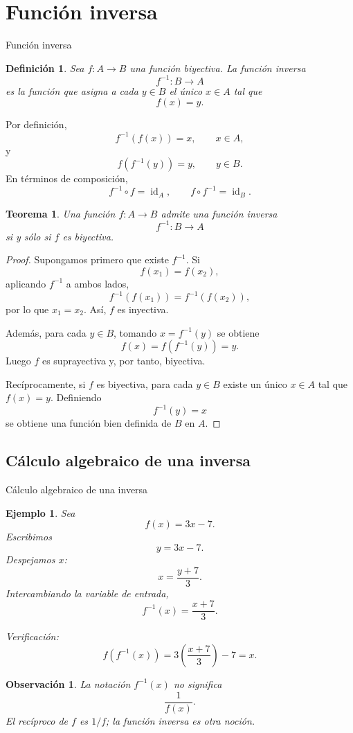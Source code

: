 \documentclass[aspectratio=169,10pt]{beamer}
\newtheorem{definicion}{Definición}
\newtheorem{teorema}{Teorema}
\newtheorem{observacion}{Observación}
\newtheorem{ejemplo}{Ejemplo}
\newcommand{\id}{\operatorname{id}}
\begin{document}
\section{Función inversa}
\begin{frame}{Función inversa}
\begin{definicion}
Sea $f:A\to B$ una función biyectiva. La función inversa
\[
f^{-1}:B\to A
\]
es la función que asigna a cada $y\in B$ el único $x\in A$ tal que
\[
f(x)=y.
\]
\end{definicion}

Por definición,
\[
f^{-1}(f(x))=x,\qquad x\in A,
\]
y
\[
f(f^{-1}(y))=y,\qquad y\in B.
\]
En términos de composición,
\[
f^{-1}\circ f=\id_A,
\qquad
f\circ f^{-1}=\id_B.
\]

\begin{teorema}
Una función $f:A\to B$ admite una función inversa
\[
f^{-1}:B\to A
\]
si y sólo si $f$ es biyectiva.
\end{teorema}

\begin{proof}
Supongamos primero que existe $f^{-1}$. Si
\[
f(x_1)=f(x_2),
\]
aplicando $f^{-1}$ a ambos lados,
\[
f^{-1}(f(x_1))=f^{-1}(f(x_2)),
\]
por lo que $x_1=x_2$. Así, $f$ es inyectiva.

Además, para cada $y\in B$, tomando $x=f^{-1}(y)$ se obtiene
\[
f(x)=f(f^{-1}(y))=y.
\]
Luego $f$ es suprayectiva y, por tanto, biyectiva.

Recíprocamente, si $f$ es biyectiva, para cada $y\in B$ existe un único
$x\in A$ tal que $f(x)=y$. Definiendo
\[
f^{-1}(y)=x
\]
se obtiene una función bien definida de $B$ en $A$.
\end{proof}
\end{frame}
\subsection{Cálculo algebraico de una inversa}
\begin{frame}{Cálculo algebraico de una inversa}
\begin{ejemplo}
Sea
\[
f(x)=3x-7.
\]
Escribimos
\[
y=3x-7.
\]
Despejamos $x$:
\[
x=\frac{y+7}{3}.
\]
Intercambiando la variable de entrada,
\[
f^{-1}(x)=\frac{x+7}{3}.
\]

Verificación:
\[
f(f^{-1}(x))
=3\left(\frac{x+7}{3}\right)-7=x.
\]
\end{ejemplo}

\begin{observacion}
La notación $f^{-1}(x)$ no significa
\[
\frac{1}{f(x)}.
\]
El recíproco de $f$ es $1/f$; la función inversa es otra noción.
\end{observacion}

\end{frame}
\end{document}
